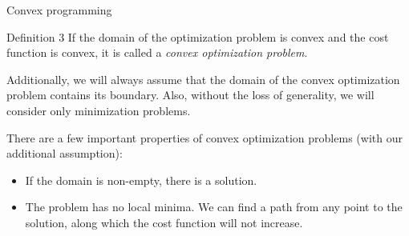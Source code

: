 \documentclass{beamer}
\begin{document}
\begin{frame}{Convex programming}
	\begin{flushleft}
		
		\begin{block}{Definition 3}
			If the domain of the optimization problem is convex and the cost function is convex, it is called a \emph{convex optimization problem}.
		\end{block}
		
		\bigskip
		
		Additionally, we will always assume that the domain of the convex optimization problem contains its boundary. Also, without the loss of generality, we will consider only minimization problems.
		
		\bigskip
		
		There are a few important properties of convex optimization problems (with our additional assumption):
		
		\begin{itemize}
			\item If the domain is non-empty, there is a solution.
			\item The problem has no local minima. We can find a path from any point to the solution, along which the cost function will not increase.
		\end{itemize}
		
	\end{flushleft}
\end{frame}
\end{document}
